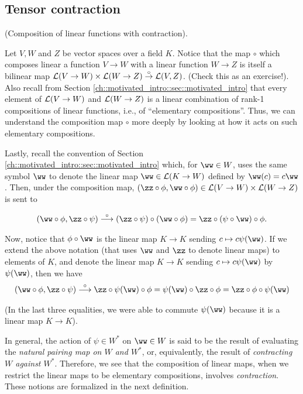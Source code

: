 \subsection*{Tensor contraction}

\begin{deriv}
\label{ch::bilinear_forms_metric_tensors::deriv::compos_linear_map_with_contract}
    (Composition of linear functions with contraction). 
    
    Let $V, W$ and $Z$ be vector spaces over a field $K$. Notice that the map $\circ$ which composes linear a function $V \rightarrow W$ with a linear function $W \rightarrow Z$ is itself a bilinear map $\mathcal{L}(V \rightarrow W) \times \mathcal{L}(W \rightarrow Z) \overset{\circ}{\rightarrow} \mathcal{L}(V, Z)$. (Check this as an exercise!). Also recall from Section \ref{ch::motivated_intro::sec::motivated_intro} that every element of $\mathcal{L}(V \rightarrow W)$ and $\mathcal{L}(W \rightarrow Z)$ is a linear combination of rank-1 compositions of linear functions, i.e., of ``elementary compositions''. Thus, we can understand the composition map $\circ$ more deeply by looking at how it acts on such elementary compositions. 
    
    Lastly, recall the convention of Section \ref{ch::motivated_intro::sec::motivated_intro} which, for $\ww \in W$, uses the same symbol $\ww$ to denote the linear map $\ww \in \LLLL(K \rightarrow W)$ defined by $\ww(c) = c\ww$. Then, under the composition map, ${(\zz \circ \phi, \ww \circ \phi) \in \LLLL(V \rightarrow W) \times \LLLL(W \rightarrow Z)}$ is sent to
    
    \begin{align*}
        (\ww \circ \phi, \zz \circ \psi) \overset{\circ}{\longrightarrow} (\zz \circ \psi) \circ (\ww \circ \phi) = \zz \circ (\psi \circ \ww) \circ \phi.
    \end{align*}
    
    Now, notice that $\phi \circ \ww$ is the linear map $K \rightarrow K$ sending $c \mapsto c\psi(\ww)$. If we extend the above notation (that uses $\ww$ and $\zz$ to denote linear maps) to elements of $K$, and denote the linear map $K \rightarrow K$ sending $c \mapsto c\psi(\ww)$ by $\psi(\ww)$, then we have 
    \begin{align*}
        (\ww \circ \phi, \zz \circ \psi) \overset{\circ}{\longrightarrow} \zz \circ \psi(\ww) \circ \phi = \psi(\ww) \circ \zz \circ \phi = \zz \circ \phi \circ \psi(\ww)
    \end{align*}
    
    (In the last three equalities, we were able to commute $\psi(\ww)$ because it is a linear map $K \rightarrow K$).
    
    In general, the action of $\psi \in W^*$ on $\ww \in W$ is said to be the result of evaluating the \textit{natural pairing map on $W$ and $W^*$}, or, equivalently, the result of \textit{contracting $W$ against $W^*$}. Therefore, we see that the composition of linear maps, when we restrict the linear maps to be elementary compositions, involves \textit{contraction}. These notions are formalized in the next definition.
\end{deriv}

